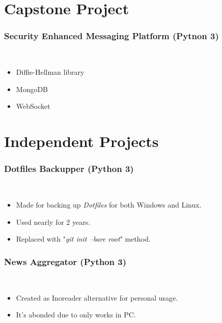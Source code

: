 \documentclass[a4paper, 9pt]{extarticle}
\begin{document}
\maketitle{}
\myeducation{}
\myexperience{}

\section{Capstone Project}
\subsubsection{Security Enhanced Messaging Platform (Pytnon 3)} \hfill \\
\vspace{-1.9em} \begin{itemize}
    \itemsep-0.7em
    \item Diffie-Hellman library
    \item MongoDB
    \item WebSocket
\end{itemize}

\section{Independent Projects}
\subsubsection{Dotfiles Backupper (Python 3)} \hfill \\
\vspace{-1.9em}\begin{itemize}
    \itemsep-0.7em
    \item Made for backing up \emph{Dotfiles} for both Windows and Linux.
    \item Used nearly for 2 years.
    \item Replaced with "\emph{git init --bare root}" method.
\end{itemize}

\subsubsection{News Aggregator (Python 3)} \hfill \\
\vspace{-1.9em}\begin{itemize}
    \itemsep-0.7em
    \item Created as Inoreader alternative for personal usage.
    \item It's abonded due to only works in PC.
\end{itemize}
\end{document}
